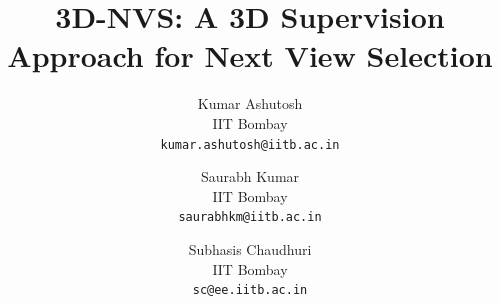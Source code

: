 \documentclass[final]{cvpr}
\begin{document}
\newcommand{\ka}[1]{\ifthenelse{\boolean{showcomments}} {\textcolor{magenta}{(Ashutosh says: #1)}} {} }
\newcommand{\sk}[1]{\ifthenelse{\boolean{showcomments}} {\textcolor{red}{(Saurabh says: #1)}} {} }

\newcommand{\blue}[1]{\textcolor{blue}{#1}} 
\newcommand{\green}[1]{\textcolor{green}{#1}} 



\title{3D-NVS: A 3D Supervision Approach for Next View Selection}

\author{Kumar Ashutosh\\
IIT Bombay\\
{\tt\small kumar.ashutosh@iitb.ac.in}
\and
Saurabh Kumar\\
IIT Bombay\\
{\tt\small saurabhkm@iitb.ac.in}

\and
Subhasis Chaudhuri\\
IIT Bombay\\
{\tt\small sc@ee.iitb.ac.in}
}

\maketitle




%

%

%

%

%

{\small


}
\end{document}

